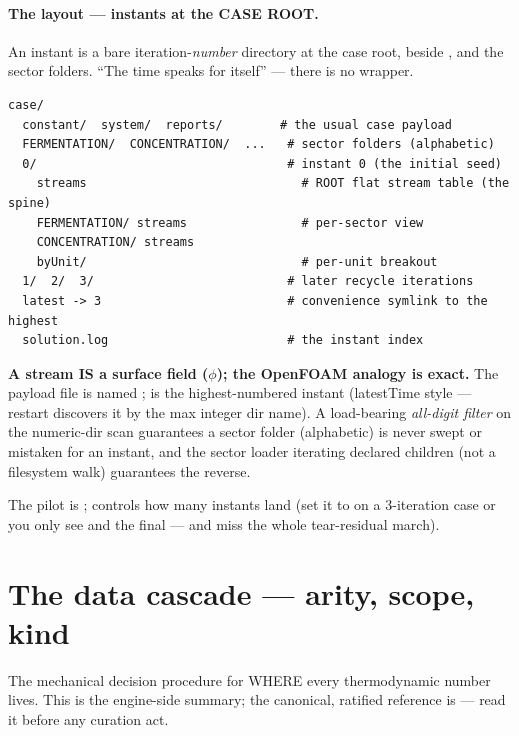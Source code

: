 \documentclass[11pt,a4paper]{article}
\begin{document}
\paragraph{The layout --- instants at the CASE ROOT.}  An instant is a bare
iteration-\emph{number} directory at the case root, beside ,
 and the sector folders.  ``The time speaks for itself'' ---
there is no  wrapper.

\begin{lstlisting}
case/
  constant/  system/  reports/        # the usual case payload
  FERMENTATION/  CONCENTRATION/  ...   # sector folders (alphabetic)
  0/                                   # instant 0 (the initial seed)
    streams                              # ROOT flat stream table (the spine)
    FERMENTATION/ streams                # per-sector view
    CONCENTRATION/ streams
    byUnit/                              # per-unit breakout
  1/  2/  3/                           # later recycle iterations
  latest -> 3                          # convenience symlink to the highest
  solution.log                         # the instant index
\end{lstlisting}

\begin{keyidea}
\textbf{A stream IS a surface field (\(\phi\)); the OpenFOAM analogy is exact.}
The payload file is named ;  is the
highest-numbered instant (latestTime style --- restart discovers it by the max
integer dir name).  A load-bearing \emph{all-digit filter} on the numeric-dir
scan guarantees a sector folder (alphabetic) is never swept or mistaken for an
instant, and the sector loader iterating declared children (not a filesystem
walk) guarantees the reverse.
\end{keyidea}

The pilot is ; 
controls how many instants land (set it to  on a 3-iteration case or
you only see  and the final --- and miss the whole tear-residual
march).

\section{The data cascade --- arity, scope, kind}\label{sec:data-cascade}

\begin{whatyoulllearn}
The mechanical decision procedure for WHERE every thermodynamic number lives.
This is the engine-side summary; the canonical, ratified reference is
 --- read it before any curation act.
\end{whatyoulllearn}
\end{document}
